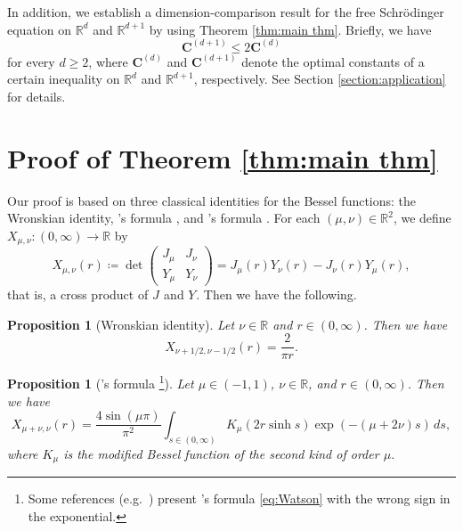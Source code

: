 \documentclass[reqno,letterpaper]{amsart}
\numberwithin{equation}{section}
\theoremstyle{plain}
\newtheorem{proposition}[theorem]{Proposition}
\newcommand{\R}{\mathbb{R}}
\newcommand{\Const}{\bm{C}}
\newcommand{\Constd}[1]{\Const^{(#1)}}
\newcommand{\BesselJ}[1]{J_{#1}}
\newcommand{\BesselK}[1]{K_{#1}}
\newcommand{\BesselY}[1]{Y_{#1}}
\newcommand{\crossmunu}[2]{X_{#1, #2}}
\newcommand{\intervaloo}[2]{(#1, #2)}
\begin{document}
	In addition, we establish a dimension-comparison result for the free Schr\"{o}dinger equation on $\R^d$ and $\R^{d+1}$ by using Theorem \ref{thm:main thm}. 
	Briefly, we have
	\begin{equation}
	\Constd{d+1} \leq 2 \Constd{d} 
	\end{equation}
	for every $d \geq 2$, where $\Constd{d}$ and $\Constd{d+1}$ denote the optimal constants of a certain inequality on $\R^d$ and $\R^{d+1}$, respectively.
	See Section \ref{section:application} for details.	
	\section{Proof of Theorem \ref{thm:main thm}} \label{section:proof}
	Our proof is based on three classical identities for the Bessel functions: the Wronskian identity, \citeauthor{Wat1944}'s formula \cite[Eq.~(5) in Section 13.73]{Wat1944}, and \citeauthor{Nic1910}'s formula \cite[Eqs.~(33), (34)]{Nic1910}.
	For each $(\mu, \nu) \in \R^2$, we define $\crossmunu{\mu}{\nu} \colon \intervaloo{0}{\infty} \to \R$ by
	\begin{equation} \label{eq:cross product}
		\crossmunu{\mu}{\nu}(r) \coloneqq \det \begin{pmatrix}
			\BesselJ{\mu} & \BesselJ{\nu} \\
			\BesselY{\mu} & \BesselY{\nu}
		\end{pmatrix}
		=
		\BesselJ{\mu}(r) \BesselY{\nu}(r) - \BesselJ{\nu}(r) \BesselY{\mu}(r) ,
	\end{equation}
	that is, a cross product of $\BesselJ{}$ and $\BesselY{}$.
	Then we have the following.
	\begin{proposition}[Wronskian identity] \label{prop:Wronskian}
		Let $\nu \in \R$ and $r \in \intervaloo{0}{\infty}$.
		Then we have
		\begin{equation} \label{eq:Wronskian}
			\crossmunu{\nu+1/2}{\nu-1/2}(r) = \frac{2}{\pi r} .
		\end{equation}
	\end{proposition}
	\begin{proposition}[\citeauthor{Wat1944}'s formula%
		\footnote{Some references (e.g.~\citet[6.617.1]{GR2014}) present \citeauthor{Wat1944}'s formula \eqref{eq:Watson} with the wrong sign in the exponential.}%
] \label{prop:Watson}
		Let $\mu \in \intervaloo{-1}{1}$, $\nu \in \R$, and $r \in \intervaloo{0}{\infty}$.
		Then we have
		\begin{equation} \label{eq:Watson}
			\crossmunu{\mu+\nu}{\nu}(r) = \frac{4 \sin( \mu \pi )}{\pi^2} \int_{s \in \intervaloo{0}{\infty}} \BesselK{\mu}(2 r \sinh{s}) \exp( - (\mu + 2\nu) s ) \, ds , 
		\end{equation}
		where $\BesselK{\mu}$ is the modified Bessel function of the second kind of order $\mu$.
	\end{proposition}
\end{document}
